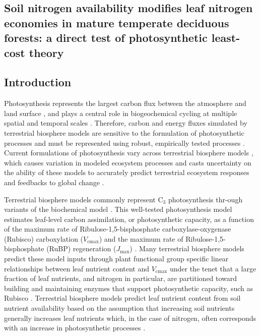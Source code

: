 \begin{singlespace}
    \chapter{\textbf{Soil nitrogen availability modifies leaf nitrogen economies in mature temperate deciduous forests: a direct test of photosynthetic least-cost theory}}
\end{singlespace}
    
\section{Introduction}
\noindent Photosynthesis represents the largest carbon flux between the atmosphere and land surface , and plays a central role in biogeochemical cycling at multiple spatial and temporal scales . Therefore, carbon and energy fluxes simulated by terrestrial biosphere models are sensitive to the formulation of photosynthetic processes  and must be represented using robust, empirically tested processes . Current formulations of photosynthesis vary across terrestrial biosphere models , which causes variation in modeled ecosystem processes  and casts uncertainty on the ability of these models to accurately predict terrestrial ecosystem responses and feedbacks to global change .

Terrestrial biosphere models commonly represent C$_{3}$ photosynthesis thr-ough variants of the  biochemical model . This well-tested photosynthesis model estimates leaf-level carbon assimilation, or photosynthetic capacity, as a function of the maximum rate of Ribulose-1,5-bisphosphate carboxylase-oxygenase (Rubisco) carboxylation ($V_\mathrm{cmax}$) and the maximum rate of Ribulose-1,5-bisphosphate (RuBP) regeneration ($J_\mathrm{max}$) . Many terrestrial biosphere models predict these model inputs through plant functional group specific linear relationships between leaf nutrient content and $V_\mathrm{cmax}$  under the tenet that a large fraction of leaf nutrients, and nitrogen in particular, are partitioned toward building and maintaining enzymes that support photosynthetic capacity, such as Rubisco . Terrestrial biosphere models predict leaf nutrient content from soil nutrient availability based on the assumption that increasing soil nutrients generally increases leaf nutrients  which, in the case of nitrogen, often corresponds with an increase in photosynthetic processes .

